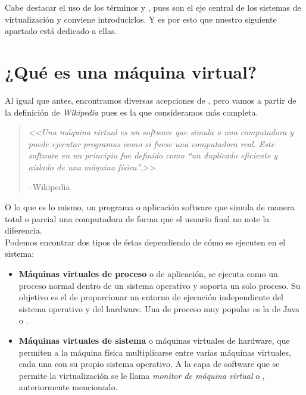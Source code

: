 Cabe destacar el uso de los términos \emph{} y , pues son el eje central de los sistemas de virtualización y conviene introducirlos. Y es por esto que nuestro siguiente apartado está dedicado a ellas.

\section{¿Qué es una máquina virtual?}

Al igual que antes, encontramos diversas acepciones de \emph{}, pero vamos a partir de la definición de \emph{Wikipedia} pues es la que consideramos más completa.

\begin{quote}
\emph{<<Una máquina virtual es un software que simula a una computadora y puede ejecutar programas como si fuese una computadora real. Este software en un principio fue definido como \textquotedblleft un duplicado eficiente y aislado de una máquina física\textquotedblright.>>}
\begin{flushright}
--Wikipedia\cite{defmaqvirwiki}
\end{flushright}
\end{quote}

O lo que es lo mismo, un programa o aplicación software que simula de manera total o parcial una computadora de forma que el usuario final no note la diferencia.\\

Podemos encontrar dos tipos de éstas dependiendo de cómo se ejecuten en el sistema:

\begin{itemize}
\item \textbf{Máquinas virtuales de proceso} o  de aplicación, se ejecuta como un proceso normal dentro de un sistema operativo y soporta un solo proceso. Su objetivo es el de proporcionar un entorno de ejecución independiente del sistema operativo y del hardware. Una  de proceso muy popular es la de Java o \emph{}.
\item \textbf{Máquinas virtuales de sistema} o máquinas virtuales de hardware, que permiten a la máquina física multiplicarse entre varias máquinas virtuales, cada una con su propio sistema operativo. A la capa de software que se permite la virtualización se le llama \emph{monitor de máquina virtual} o , anteriormente mencionado.
\end{itemize}

